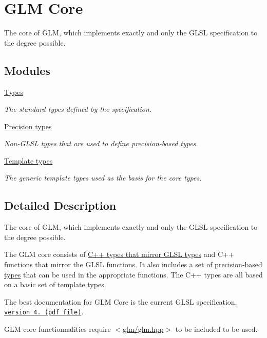 \hypertarget{group__core}{}\section{G\+L\+M Core}
\label{group__core}


The core of G\+L\+M, which implements exactly and only the G\+L\+S\+L specification to the degree possible.  


\subsection*{Modules}
\begin{DoxyCompactItemize}
\item 
\hyperlink{group__core__types}{Types}
\begin{DoxyCompactList}\small\item\em The standard types defined by the specification. \end{DoxyCompactList}\item 
\hyperlink{group__core__precision}{Precision types}
\begin{DoxyCompactList}\small\item\em Non-\/\+G\+L\+S\+L types that are used to define precision-\/based types. \end{DoxyCompactList}\item 
\hyperlink{group__core__template}{Template types}
\begin{DoxyCompactList}\small\item\em The generic template types used as the basis for the core types. \end{DoxyCompactList}\end{DoxyCompactItemize}


\subsection{Detailed Description}
The core of G\+L\+M, which implements exactly and only the G\+L\+S\+L specification to the degree possible. 

The G\+L\+M core consists of \hyperlink{group__core__types}{C++ types that mirror G\+L\+S\+L types} and C++ functions that mirror the G\+L\+S\+L functions. It also includes \hyperlink{group__core__precision}{a set of precision-\/based types} that can be used in the appropriate functions. The C++ types are all based on a basic set of \hyperlink{group__core__template}{template types}.

The best documentation for G\+L\+M Core is the current G\+L\+S\+L specification, \href{http://www.opengl.org/registry/doc/GLSLangSpec.4.20.8.clean.pdf}{\tt version 4. (pdf file)}.

G\+L\+M core functionnalities require $<$\hyperlink{glm_8hpp}{glm/glm.\+hpp}$>$ to be included to be used. 